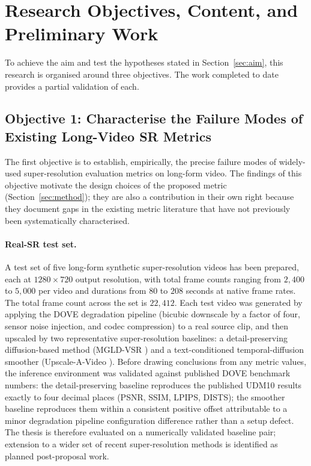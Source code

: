 \section{Research Objectives, Content, and Preliminary Work}
\label{sec:preliminary}

To achieve the aim and test the hypotheses stated in Section~\ref{sec:aim}, this research
is organised around three objectives. The work completed to date provides a partial
validation of each.

\subsection{Objective 1: Characterise the Failure Modes of Existing Long-Video SR Metrics}
\label{sec:obj:characterise}

The first objective is to establish, empirically, the precise failure modes of widely-used
super-resolution evaluation metrics on long-form video. The findings of this objective
motivate the design choices of the proposed metric (Section~\ref{sec:method}); they are
also a contribution in their own right because they document gaps in the existing metric
literature that have not previously been systematically characterised.

\paragraph{Real-SR test set.} A test set of five long-form synthetic super-resolution
videos has been prepared, each at $1280 \times 720$ output resolution, with total frame
counts ranging from $2{,}400$ to $5{,}000$ per video and durations from $80$ to $208$
seconds at native frame rates. The total frame count across the set is $22{,}412$. Each
test video was generated by applying the DOVE \cite{yang_dove_2024} degradation pipeline
(bicubic downscale by a factor of four, sensor noise injection, and codec compression) to
a real source clip, and then upscaled by two representative super-resolution baselines: a
detail-preserving diffusion-based method (MGLD-VSR \cite{he_mgld_2024}) and a
text-conditioned temporal-diffusion smoother (Upscale-A-Video \cite{zhou_upscale_2024}).
Before drawing conclusions from any metric values, the inference environment was validated
against published DOVE benchmark numbers: the detail-preserving baseline reproduces the
published UDM10 results exactly to four decimal places (PSNR, SSIM, LPIPS, DISTS); the
smoother baseline reproduces them within a consistent positive offset attributable to a
minor degradation pipeline configuration difference rather than a setup defect. The thesis
is therefore evaluated on a numerically validated baseline pair; extension to a wider set of
recent super-resolution methods is identified as planned post-proposal work.


